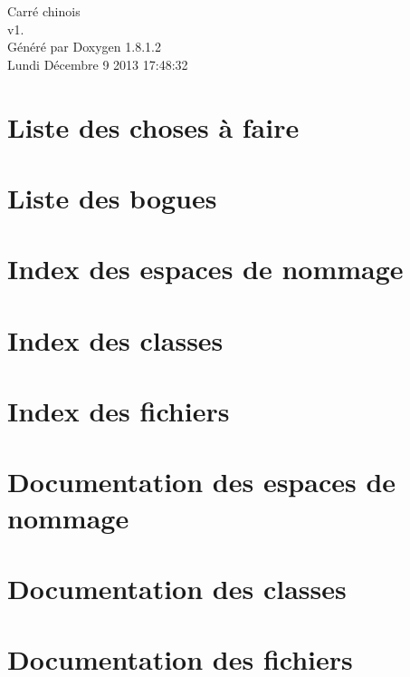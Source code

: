 \documentclass{book}
\begin{document}
\hypersetup{pageanchor=false,citecolor=blue}
\begin{titlepage}
\vspace*{7cm}
\begin{center}
{\Large Carré chinois \\[1ex]\large v1. }\\
\vspace*{1cm}
{\large Généré par Doxygen 1.8.1.2}\\
\vspace*{0.5cm}
{\small Lundi Décembre 9 2013 17:48:32}\\
\end{center}
\end{titlepage}
\clearemptydoublepage
{}
\tableofcontents
\clearemptydoublepage
{}
\hypersetup{pageanchor=true,citecolor=blue}
\chapter{Liste des choses à faire}
\label{todo}
\hypertarget{todo}{}

\chapter{Liste des bogues}
\label{bug}
\hypertarget{bug}{}

\chapter{Index des espaces de nommage}

\chapter{Index des classes}

\chapter{Index des fichiers}

\chapter{Documentation des espaces de nommage}






\chapter{Documentation des classes}






\chapter{Documentation des fichiers}











\printindex
\end{document}
